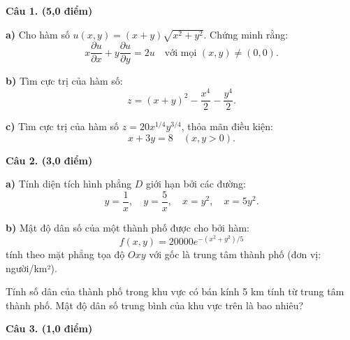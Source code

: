 \vspace{1cm}


\noindent\textbf{\large Câu 1. (5,0 điểm)}

\vspace{0.3cm}

\textbf{a)} Cho hàm số $u(x, y) = (x + y)\sqrt{x^2 + y^2}$. Chứng minh rằng:
\[
    x\dfrac{\partial u}{\partial x} + y\dfrac{\partial u}{\partial y} = 2u 
    \quad \text{với mọi } (x, y) \neq (0,0).
\]

\vspace{0.4cm}

\textbf{b)} Tìm cực trị của hàm số:
\[
    z = (x + y)^2 - \dfrac{x^4}{2} - \dfrac{y^4}{2}.
\]

\vspace{0.4cm}

\textbf{c)} Tìm cực trị của hàm số $z = 20x^{1/4}y^{3/4}$, thỏa mãn điều kiện:
\[
    x + 3y = 8 \quad (x, y > 0).
\]

\vspace{0.6cm}
\noindent\textbf{\large Câu 2. (3,0 điểm)}

\vspace{0.3cm}

\textbf{a)} Tính diện tích hình phẳng $D$ giới hạn bởi các đường:
\[
    y = \dfrac{1}{x}, \quad 
    y = \dfrac{5}{x}, \quad 
    x = y^2, \quad 
    x = 5y^2.
\]

\vspace{0.4cm}

\textbf{b)} Mật độ dân số của một thành phố được cho bởi hàm:
\[
    f(x, y) = 20000e^{-(x^2+y^2)/5}
\]
tính theo mặt phẳng tọa độ $Oxy$ với gốc là trung tâm thành phố (đơn vị: người/km²).

Tính số dân của thành phố trong khu vực có bán kính 5 km tính từ trung tâm thành phố. Mật độ dân số trung bình của khu vực trên là bao nhiêu?

\vspace{0.6cm}
\noindent\textbf{\large Câu 3. (1,0 điểm)}

